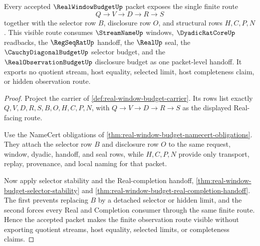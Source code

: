 \begin{theorem}
\label{thm:real-window-budget-finite-route-visibility}
Every accepted $\RealWindowBudgetUp$ packet exposes the single finite route
$$
Q \to V \to D \to R \to S
$$
together with the selector row $B$, disclosure row $O$, and structural rows $H,C,P,N$. This visible route consumes $\StreamNameUp$ windows, $\DyadicRatCoreUp$ readbacks, the $\RegSeqRatUp$ handoff, the $\RealUp$ seal, the $\CauchyDiagonalBudgetUp$ selector budget, and the $\RealObservationBudgetUp$ disclosure budget as one packet-level handoff. It exports no quotient stream, host equality, selected limit, host completeness claim, or hidden observation route.
\end{theorem}
\begin{proof}
Project the carrier of \autoref{def:real-window-budget-carrier}. Its rows list exactly $Q,V,D,R,S,B,O,H,C,P,N$, with $Q \to V \to D \to R \to S$ as the displayed Real-facing route.

Use the NameCert obligations of \autoref{thm:real-window-budget-namecert-obligations}. They attach the selector row $B$ and disclosure row $O$ to the same request, window, dyadic, handoff, and seal rows, while $H,C,P,N$ provide only transport, replay, provenance, and local naming for that packet.

Now apply selector stability and the Real-completion handoff, \autoref{thm:real-window-budget-selector-stability} and \autoref{thm:real-window-budget-real-completion-handoff}. The first prevents replacing $B$ by a detached selector or hidden limit, and the second forces every Real and Completion consumer through the same finite route. Hence the accepted packet makes the finite observation route visible without exporting quotient streams, host equality, selected limits, or completeness claims.
\end{proof}



